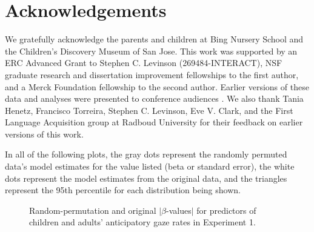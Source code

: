 \documentclass[authoryear, 12pt]{elsarticle}
\begin{document}
\section*{Acknowledgements}

We gratefully acknowledge the parents and children at Bing Nursery School and the Children's Discovery Museum of San Jose. This work was supported by an ERC Advanced Grant to Stephen C. Levinson (269484-INTERACT), NSF graduate research and dissertation improvement fellowships to the first author, and a Merck Foundation fellowship to the second author. Earlier versions of these data and analyses were presented to conference audiences \citep{casillas2012, casillas2013}. We also thank Tania Henetz, Francisco Torreira, Stephen C. Levinson, Eve V. Clark, and the First Language Acquisition group at Radboud University for their feedback on earlier versions of this work.




\appendix
\setcounter{figure}{0}  
In all of the following plots, the gray dots represent the randomly permuted data's model estimates for the value listed (beta or standard error), the white dots represent the model estimates from the original data, and the triangles represent the 95th percentile for each distribution being shown.

\begin{figure}
  \centering
  \hfill
  \caption{Random-permutation and original $|$\textit{$\beta$}-values$|$ for predictors of children and adults' anticipatory gaze rates in Experiment 1.}
\end{figure}
\end{document}
